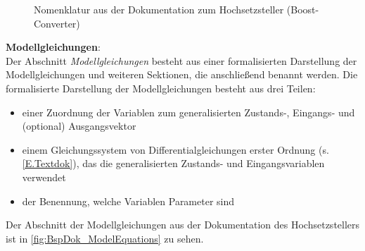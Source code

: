 \begin{figure}[H]
	\centering
	\caption[Beispiel zur Nomenklatur der Dokumentation]{Nomenklatur aus der Dokumentation zum Hochsetzsteller (Boost-Converter)}
	\label{fig:BspDok_Nomenclature}
\end{figure}
%
\textbf{Modellgleichungen}:\\
Der Abschnitt \textit{Modellgleichungen} besteht aus einer formalisierten Darstellung der Modellgleichungen und weiteren Sektionen, die anschließend benannt werden. Die formalisierte Darstellung der Modellgleichungen besteht aus drei Teilen:  
\begin{itemize}[label=$\bullet$]
	\item einer Zuordnung der Variablen zum generalisierten Zustands-, Eingangs- und (optional) Ausgangsvektor
	\item einem Gleichungssystem von Differentialgleichungen erster Ordnung (s. \ref{E.Textdok}), das die generalisierten Zustands- und Eingangsvariablen verwendet
	\item der Benennung, welche Variablen Parameter sind
\end{itemize} 
Der Abschnitt der Modellgleichungen aus der Dokumentation des Hochsetzstellers ist in \autoref{fig:BspDok_ModelEquations} zu sehen.

